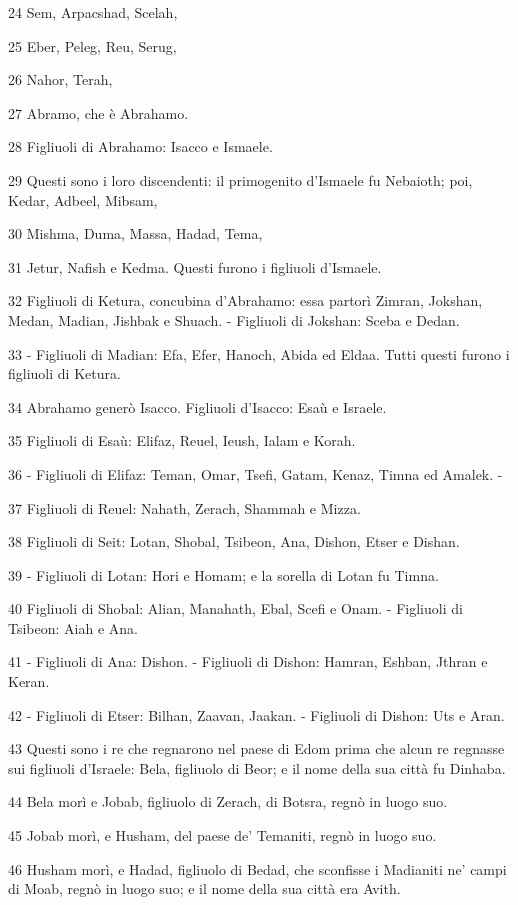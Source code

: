 \par 24 Sem, Arpacshad, Scelah,
\par 25 Eber, Peleg, Reu, Serug,
\par 26 Nahor, Terah,
\par 27 Abramo, che è Abrahamo.
\par 28 Figliuoli di Abrahamo: Isacco e Ismaele.
\par 29 Questi sono i loro discendenti: il primogenito d'Ismaele fu Nebaioth; poi, Kedar, Adbeel, Mibsam,
\par 30 Mishma, Duma, Massa, Hadad, Tema,
\par 31 Jetur, Nafish e Kedma. Questi furono i figliuoli d'Ismaele.
\par 32 Figliuoli di Ketura, concubina d'Abrahamo: essa partorì Zimran, Jokshan, Medan, Madian, Jishbak e Shuach. - Figliuoli di Jokshan: Sceba e Dedan.
\par 33 - Figliuoli di Madian: Efa, Efer, Hanoch, Abida ed Eldaa. Tutti questi furono i figliuoli di Ketura.
\par 34 Abrahamo generò Isacco. Figliuoli d'Isacco: Esaù e Israele.
\par 35 Figliuoli di Esaù: Elifaz, Reuel, Ieush, Ialam e Korah.
\par 36 - Figliuoli di Elifaz: Teman, Omar, Tsefi, Gatam, Kenaz, Timna ed Amalek. -
\par 37 Figliuoli di Reuel: Nahath, Zerach, Shammah e Mizza.
\par 38 Figliuoli di Seit: Lotan, Shobal, Tsibeon, Ana, Dishon, Etser e Dishan.
\par 39 - Figliuoli di Lotan: Hori e Homam; e la sorella di Lotan fu Timna.
\par 40 Figliuoli di Shobal: Alian, Manahath, Ebal, Scefi e Onam. - Figliuoli di Tsibeon: Aiah e Ana.
\par 41 - Figliuoli di Ana: Dishon. - Figliuoli di Dishon: Hamran, Eshban, Jthran e Keran.
\par 42 - Figliuoli di Etser: Bilhan, Zaavan, Jaakan. - Figliuoli di Dishon: Uts e Aran.
\par 43 Questi sono i re che regnarono nel paese di Edom prima che alcun re regnasse sui figliuoli d'Israele: Bela, figliuolo di Beor; e il nome della sua città fu Dinhaba.
\par 44 Bela morì e Jobab, figliuolo di Zerach, di Botsra, regnò in luogo suo.
\par 45 Jobab morì, e Husham, del paese de' Temaniti, regnò in luogo suo.
\par 46 Husham morì, e Hadad, figliuolo di Bedad, che sconfisse i Madianiti ne' campi di Moab, regnò in luogo suo; e il nome della sua città era Avith.
